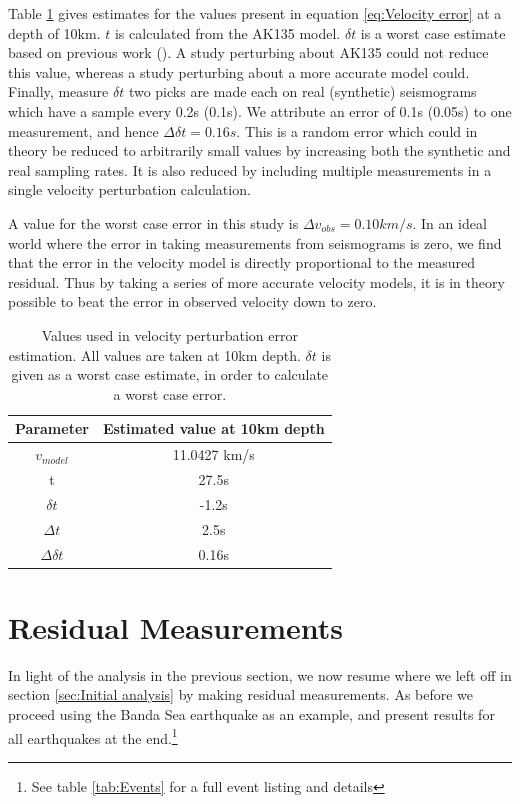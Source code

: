 \documentclass[11pt,a4paper]{article}
\begin{document}
Table \ref{tab:Error values} gives estimates for the values present in equation \eqref{eq:Velocity error} at a depth of 10km. $t$ is calculated from the AK135 model. $\delta t$ is a worst case estimate based on previous work (\cite{Waszek2011a}). A study perturbing about AK135 could not reduce this value, whereas a study perturbing about a more accurate model could. Finally, measure $\delta t$ two picks are made each on real (synthetic) seismograms which have a sample every 0.2s (0.1s). We attribute an error of 0.1s (0.05s) to one measurement, and hence $\Delta \delta t = 0.16s$. This is a random error which could in theory be reduced to arbitrarily small values by increasing both the synthetic and real sampling rates. It is also reduced by including multiple measurements in a single velocity perturbation calculation.

A value for the worst case error in this study is $\Delta v_{obs} = 0.10 km/s$. In an ideal world where the error in taking measurements from seismograms is zero, we find that the error in the velocity model is directly proportional to the measured residual. Thus by taking a series of more accurate velocity models, it is in theory possible to beat the error in observed velocity down to zero.

\begin{table}
\centering
\begin{tabular}{| c | c |}
	\hline
	Parameter		& Estimated value at 10km depth	\\ \hline \hline
	$v_{model}$	& 11.0427 km/s					\\ \hline
	t			& 27.5s						\\ \hline
	$\delta t$		& -1.2s						\\ \hline
	$\Delta t$		& 2.5s						\\ \hline
	$\Delta \delta t$	& 0.16s						\\				
	\hline
\end{tabular}
\caption{Values used in velocity perturbation error estimation. All values are taken at 10km depth. $\delta t$ is given as a worst case estimate, in order to calculate a worst case error.}
\label{tab:Error values}
\end{table}

\section{Residual Measurements}
\label{sec:Resid measurements}

In light of the analysis in the previous section, we now resume where we left off in section \ref{sec:Initial analysis} by making residual measurements. As before we proceed using the Banda Sea earthquake as an example, and present results for all earthquakes at the end.\footnote{See table \ref{tab:Events} for a full event listing and details}
\end{document}
